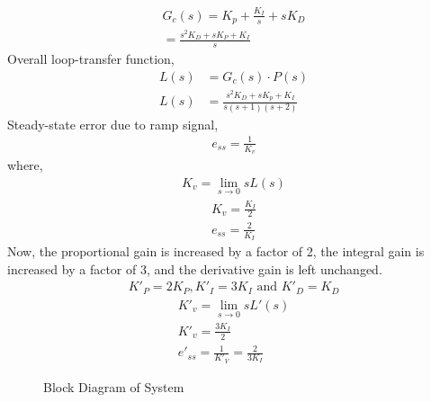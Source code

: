 \documentclass[journal,12pt,twocolumn]{IEEEtran}
\theoremstyle{remark}
\begin{document}
\begin{align}
    G_c(s) = K_p + \frac{K_I}{s} +sK_D\\
    =\frac{s^2K_D + sK_P + K_I}{s}
\end{align}
Overall loop-transfer function,
\begin{align}
    L(s) &= G_c(s)\cdot P(s)\\
    L(s) &= \frac{s^2K_D + sK_p + K_I}{s(s+1)(s+2)}
\end{align}
Steady-state error due to ramp signal,
\begin{align}
    e_{ss} = \frac{1}{K_v}
\end{align}
where,
\begin{align}
    K_v = \lim_{s \to 0} sL(s)
\end{align}
\begin{align}
    K_v = \frac{K_I}{2}\\
    e_{ss} = \frac{2}{K_I}
\end{align}
Now, the proportional gain is increased by a factor of 2, the integral gain is increased by a factor of 3, and the derivative gain is left unchanged.
\begin{align}
    K'_P = 2K_P, K'_I = 3K_I \text{ and } K'_D = K_D
\end{align}
\begin{align}
    K'_v = \lim_{s \to 0} sL'(s)\\
    K'_v = \frac{3K_I}{2}\\
    e'_{ss} = \frac{1}{K'_V} = \frac{2}{3K_I}
\end{align}
\begin{figure}[!ht]
    \resizebox{0.55\textwidth}{!}{}
    \caption{Block Diagram of System}
    \label{fig:gate_IN_Q41_blockdiagram}
\end{figure}


% 
\end{document}
